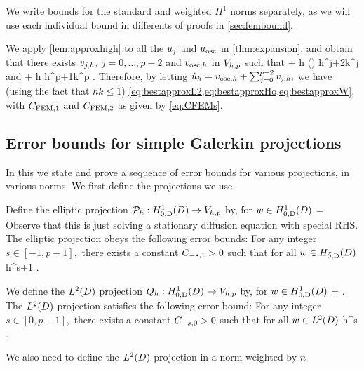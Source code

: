 We write bounds for the standard and weighted $H^1$ norms separately, as we will use each individual bound in differents of proofs in \cref{sec:fembound}.

We apply \cref{lem:approxhigh} to all the $u_{j}$ and $u_{\mathrm{osc}}$ in \cref{thm:expansion}, and obtain that there exists $v_{j,h},$ $j=0,\ldots,p-2$ and $v_{\mathrm{osc},h}$ in $V_{h,p}$ such that 
\beqs
\NLtD{\usj - \vjh} + h\NHoD{\usj - \vjh} \leq {} \Pj\mleft(\mright) h^{j+2}k^j \Cfg
\eeqs
and
\beqs
\NLtD{\uosc - \vosch} + h\NHoD{\uosc - \vosch} \leq {} \Cosc\CAnk h^{p+1}k^p \Cfg.
\eeqs
Therefore, by letting $\hat{u}_{h} = v_{\mathrm{osc},h} + \sum_{j=0}^{p-2} v_{j,h},$ we have (using the fact that $hk \leq 1$) \cref{eq:bestapproxL2,eq:bestapproxHo,eq:bestapproxW}, with $C_{\mathrm{FEM},1}$ and $C_{\mathrm{FEM},2}$ as given by \cref{eq:CFEMs}.
\epf

\subsection{Error bounds for simple Galerkin projections}\label{sec:errgalerkin}
In this  we state and prove a sequence of error bounds for various projections, in various norms. We first define the projections we use.

Define the elliptic projection $\Ph:\HozDD\rightarrow\Vhp$ by, for $w \in \HozDD$
\beqs
{} =  \tforall \vh \in \Vhp
\eeqs
Observe that this is just solving a stationary diffusion equation with special RHS.
The elliptic projection obeys the following error bounds:
\label{lem:ellprojerr}
For any integer $s \in [-1,p-1],$ there exists a constant $C_{-s,1} >0$ such that for all $w \in \HozDD$
\beq\label{eq:ellprojerr}
 \leq \Cmso h^{s+1} .
\eeq
\ele{}

We define the $\LtD$ projection $\Qh:\HozDD\rightarrow \Vhp$ by, for $w \in \HozDD$
\beqs
{} =  \tforall \vh \in \Vhp.
\eeqs
The $\LtD$ projection satisfies the following error bound:
\label{lem:ltdprojerr}
For any integer $s \in [0,p-1],$ there exists a constant $C_{-s,0} >0$ such that for all $w \in \LtD$
\beqs
{} \leq \Cmso h^{s} .
\eeqs
\ele{}

We also need to define the $\LtD$ projection in a norm weighted by $n$

